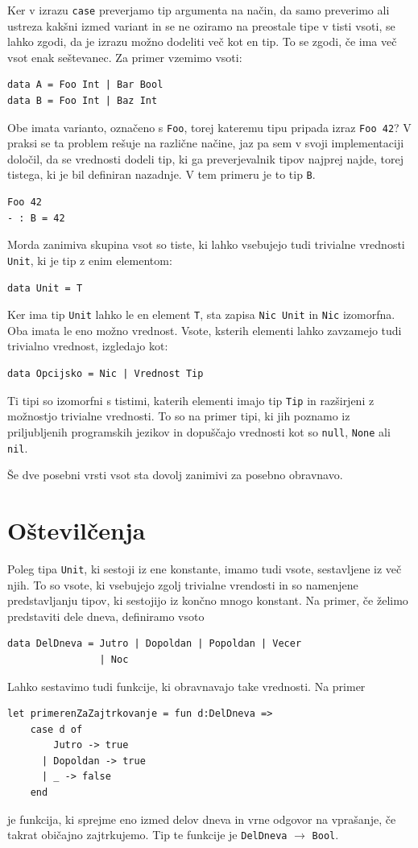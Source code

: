 \documentclass[a4paper,12pt,openright]{book}
\begin{document}
Ker v izrazu \lstinline{case} preverjamo tip argumenta na način, da samo preverimo ali ustreza kakšni izmed variant in se ne oziramo na preostale tipe v tisti vsoti, 
se lahko zgodi, da je izrazu možno dodeliti več kot en tip. To se zgodi, če ima več vsot enak seštevanec. Za primer vzemimo vsoti:
\begin{lstlisting}
data A = Foo Int | Bar Bool
data B = Foo Int | Baz Int
\end{lstlisting}
Obe imata varianto, označeno s \lstinline{Foo}, torej kateremu tipu pripada izraz \lstinline{Foo 42}? V praksi se ta problem rešuje na različne načine, jaz pa sem v svoji implementaciji določil, da se vrednosti 
dodeli tip, ki ga preverjevalnik tipov najprej najde, torej tistega, ki je bil definiran nazadnje. V tem primeru je to tip \lstinline{B}.
\begin{lstlisting}
Foo 42
- : B = 42
\end{lstlisting}

Morda zanimiva skupina vsot so tiste, ki lahko vsebujejo tudi trivialne vrednosti \lstinline{Unit}, ki je tip z enim elementom:
\begin{lstlisting}
data Unit = T
\end{lstlisting}
Ker ima tip \lstinline{Unit} lahko le en element \lstinline{T}, sta zapisa \lstinline{Nic Unit} in \lstinline{Nic} izomorfna. Oba imata le eno možno vrednost. Vsote, ksterih elementi lahko zavzamejo tudi trivialno vrednost, izgledajo kot:
\begin{lstlisting}
data Opcijsko = Nic | Vrednost Tip
\end{lstlisting}
Ti tipi so izomorfni s tistimi, katerih elementi imajo tip \lstinline{Tip} in razširjeni z možnostjo trivialne vrednosti. To so na primer tipi, ki jih poznamo iz priljubljenih programskih jezikov in dopuščajo 
vrednosti kot so \lstinline{null}, \lstinline{None} ali \lstinline{nil}.

Še dve posebni vrsti vsot sta dovolj zanimivi za posebno obravnavo.

\section{Oštevilčenja}
Poleg tipa \lstinline{Unit}, ki sestoji iz ene konstante, imamo tudi vsote, sestavljene iz več njih. To so vsote, ki vsebujejo zgolj trivialne vrendosti in so namenjene predstavljanju tipov, ki sestojijo iz končno mnogo konstant. 
Na primer, če želimo predstaviti dele dneva, definiramo vsoto
\begin{lstlisting}
data DelDneva = Jutro | Dopoldan | Popoldan | Vecer 
                | Noc
\end{lstlisting}
Lahko sestavimo tudi funkcije, ki obravnavajo take vrednosti. Na primer
\begin{lstlisting}
let primerenZaZajtrkovanje = fun d:DelDneva =>
    case d of 
        Jutro -> true
      | Dopoldan -> true
      | _ -> false
    end
\end{lstlisting}
je funkcija, ki sprejme eno izmed delov dneva in vrne odgovor na vprašanje, če takrat običajno zajtrkujemo. Tip te funkcije je \lstinline{DelDneva} $\rightarrow$ \lstinline{Bool}.
\end{document}
